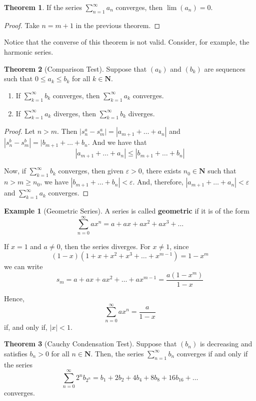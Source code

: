 \documentclass[tikz,12pt,a4paper]{article}
\theoremstyle{definition}
\newtheorem{theorem}{Theorem}[section]
\newtheorem{example}{Example}[section]
\begin{document}
\begin{theorem}
	If the series $\sum_{n=1}^\infty a_n$ converges, then $\lim (a_n) = 0$.
\end{theorem}

\begin{proof}
	Take $n = m+1$ in the previous theorem.
\end{proof}

Notice that the converse of this theorem is not valid. Consider, for example, the harmonic series. 

\begin{theorem}[Comparison Test]
	Suppose that $(a_k)$ and $(b_k)$ are sequences such that $0 \leq a_k \leq b_k$ for all $k \in \textbf{N}$.
	\begin{enumerate}
		\item If $\sum_{k=1}^\infty b_k$ converges, then $\sum_{k=1}^\infty a_k$ converges.
		\item If $\sum_{k=1}^\infty a_k$ diverges, then $\sum_{k=1}^\infty b_k$ diverges.
	\end{enumerate}
\end{theorem}

\begin{proof}
	Let $n > m$. Then $|s_n^a - s_m^a| = |a_{m+1} + \ldots + a_n|$ and $|s_n^b - s_m^b| = |b_{m+1} + \ldots + b_n$. And we have that \[ |a_{m+1} + \ldots + a_n | \leq |b_{m+1} + \ldots + b_n| \]
	
	Now, if $\sum_{k=1}^\infty b_k$ converges, then given $\varepsilon > 0$, there exists $n_0 \in \textbf{N}$ such that $n > m \geq n_0$, we have $|b_{m+1} + \ldots + b_n| < \varepsilon$. And, therefore, $|a_{m+1} + \ldots + a_n| < \varepsilon$ and $\sum_{k=1}^\infty a_k$ converges.
\end{proof}

\begin{example}[Geometric Series]
	A series is called \textbf{geometric} if it is of the form
	\[
		\sum_{n=0}^\infty ax^n = a + ax + ax^2 + ax^3 + \ldots
	\]
	
	If $x = 1$ and $a \neq 0$, then the series diverges. For $x \neq 1$, since
	\[
		(1-x)(1+x+x^2+x^3+\ldots+x^{m-1}) = 1 - x^m 
	\]
	we can write
	\[
		s_m = a + ax + ax^2 + \ldots + ax^{m-1} = \frac{a(1-x^m)}{1-x}
	\]
	
	Hence, 
	\[
		\sum_{n=0}^\infty ax^n = \frac{a}{1-x}
	\]
	if, and only if, $|x| < 1$.
\end{example}

\begin{theorem}[Cauchy Condensation Test]
	Suppose that $(b_n)$ is decreasing and satisfies $b_n > 0$ for all $n \in \textbf{N}$. Then, the series $\sum_{n=1}^\infty b_n$ converges if and only if the series
	\[
		\sum_{n=0}^\infty 2^n b_{2^n} = b_1 + 2b_2 + 4b_4 + 8b_8 + 16b_16 + \ldots
	\]
	converges.
\end{theorem}
\end{document}
